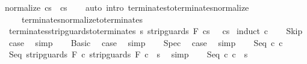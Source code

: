 \begin{isabellebody}
{\isachardoublequoteopen}{\isasymGamma}{\isasymturnstile}normalize\ c{\isasymdown}s\ {\isacharequal}\ {\isasymGamma}{\isasymturnstile}c{\isasymdown}s{\isachardoublequoteclose}\isanewline
%
\isadelimproof
\ \ %
\endisadelimproof
%
\isatagproof
{}\isamarkupfalse%
\ {\isacharparenleft}auto\ intro{\isacharcolon}\ terminates{\isacharunderscore}to{\isacharunderscore}terminates{\isacharunderscore}normalize\ \isanewline
\ \ \ \ terminates{\isacharunderscore}normalize{\isacharunderscore}to{\isacharunderscore}terminates{\isacharparenright}%
\endisatagproof
{\isafoldproof}%
%
\isadelimproof
%
\endisadelimproof
%
\isamarkuptrue%
\isamarkupfalse%
\ terminates{\isacharunderscore}strip{\isacharunderscore}guards{\isacharunderscore}to{\isacharunderscore}terminates{\isacharcolon}\ {\isachardoublequoteopen}{\isasymAnd}s{\isachardot}\ {\isasymGamma}{\isasymturnstile}strip{\isacharunderscore}guards\ F\ c{\isasymdown}s\ \ {\isasymLongrightarrow}\ {\isasymGamma}{\isasymturnstile}c{\isasymdown}s{\isachardoublequoteclose}\isanewline
%
\isadelimproof
%
\endisadelimproof
%
\isatagproof
{}\isamarkupfalse%
\ {\isacharparenleft}induct\ c{\isacharparenright}\isanewline
\ \ \isamarkupfalse%
\ Skip\ \isamarkupfalse%
\ {\isacharquery}case\ \isamarkupfalse%
\ simp\isanewline
{}\isamarkupfalse%
\isanewline
\ \ \isamarkupfalse%
\ Basic\ \isamarkupfalse%
\ {\isacharquery}case\ \isamarkupfalse%
\ simp\isanewline
{}\isamarkupfalse%
\isanewline
\ \ \isamarkupfalse%
\ Spec\ \isamarkupfalse%
\ {\isacharquery}case\ \isamarkupfalse%
\ simp\isanewline
{}\isamarkupfalse%
\isanewline
\ \ \isamarkupfalse%
\ {\isacharparenleft}Seq\ c{}\ c{}{\isacharparenright}\isanewline
\ \ \isamarkupfalse%
\ {\isachardoublequoteopen}{\isasymGamma}{\isasymturnstile}Seq\ {\isacharparenleft}strip{\isacharunderscore}guards\ F\ c{}{\isacharparenright}\ {\isacharparenleft}strip{\isacharunderscore}guards\ F\ c{}{\isacharparenright}\ {\isasymdown}\ s{\isachardoublequoteclose}\ \isamarkupfalse%
\ simp\isanewline
\ \ \isamarkupfalse%
\ {\isachardoublequoteopen}{\isasymGamma}{\isasymturnstile}Seq\ c{}\ c{}\ {\isasymdown}\ s{\isachardoublequoteclose}\isanewline
\ \ \isamarkupfalse%

\end{isabellebody}
